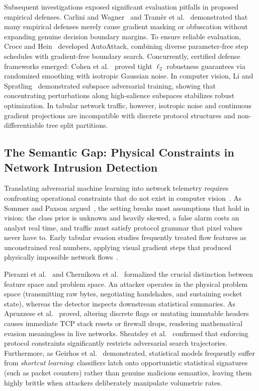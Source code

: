 \documentclass[iicol,pdflatex,sn-mathphys-num]{sn-jnl}
\begin{document}
Subsequent investigations exposed significant evaluation pitfalls in proposed empirical defenses. Carlini and Wagner~\cite{carlini2017evaluating} and Tram{\`e}r et al.~\cite{tramer2020adaptive} demonstrated that many empirical defenses merely cause gradient masking or obfuscation without expanding genuine decision boundary margins. To ensure reliable evaluation, Croce and Hein~\cite{croce2020reliable} developed AutoAttack, combining diverse parameter-free step schedules with gradient-free boundary search. Concurrently, certified defense frameworks emerged: Cohen et al.~\cite{cohen2019certified} proved tight $\ell_2$ robustness guarantees via randomized smoothing with isotropic Gaussian noise. In computer vision, Li and Spratling~\cite{li2021subspace} demonstrated subspace adversarial training, showing that concentrating perturbations along high-salience subspaces stabilizes robust optimization. In tabular network traffic, however, isotropic noise and continuous gradient projections are incompatible with discrete protocol structures and non-differentiable tree split partitions.

\subsection{The Semantic Gap: Physical Constraints in Network Intrusion Detection}
\label{sec:rel_ids_constraints}
Translating adversarial machine learning into network telemetry requires confronting operational constraints that do not exist in computer vision~\cite{corona2013adversarial}. As Sommer and Paxson argued~\cite{sommer2010outside}, the setting breaks most assumptions that hold in vision: the class prior is unknown and heavily skewed, a false alarm costs an analyst real time, and traffic must satisfy protocol grammar that pixel values never have to. Early tabular evasion studies frequently treated flow features as unconstrained real numbers, applying visual gradient steps that produced physically impossible network flows~\cite{alhajjar2021adversarial}.

Pierazzi et al.~\cite{pierazzi2020intriguing} and Chernikova et al.~\cite{chernikova2023problem} formalized the crucial distinction between feature space and problem space. An attacker operates in the physical problem space (transmitting raw bytes, negotiating handshakes, and sustaining socket state), whereas the detector inspects downstream statistical summaries. As Apruzzese et al.~\cite{apruzzese2022modeling,apruzzese2023real} proved, altering discrete flags or mutating immutable headers causes immediate TCP stack resets or firewall drops, rendering mathematical evasion meaningless in live networks. Sheatsley et al.~\cite{sheatsley2022space} confirmed that enforcing protocol constraints significantly restricts adversarial search trajectories. Furthermore, as Geirhos et al.~\cite{geirhos2020shortcut} demonstrated, statistical models frequently suffer from \textit{shortcut learning}: classifiers latch onto opportunistic statistical signatures (such as packet counters) rather than genuine malicious semantics, leaving them highly brittle when attackers deliberately manipulate volumetric rates.
\end{document}
